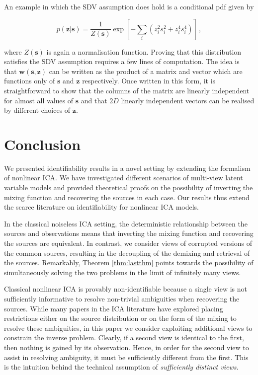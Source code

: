 An example in which the SDV assumption does hold is a conditional pdf given by

\begin{equation}
p(\bm{z}|\bm{s}) = \frac{1}{Z(\bm{s})} \exp \left[ - \sum_i (z_i^2  s_i^2 + z_i^4 s_i^4  ) \right]\,, \label{eq:satisfied}
\end{equation}

where $Z(\bm{s})$ is again a normalisation function.
Proving that this distribution satisfies the SDV assumption requires a few lines of computation.
The idea is that $\bm{w}(\bm{s}, \bm{z})$ can be written as the product of a matrix and vector which are functions only of $\bm{s}$ and $\bm{z}$ respectively.
Once written in this form, it is straightforward to show that the columns of the matrix are linearly independent for almost all values of $\bm{s}$ and that $2D$ linearly independent vectors can be realised by different choices of $\bm{z}$.


\section{Conclusion}
\label{sec:on_suffistv}
We presented identifiability results in a novel setting by extending the formalism of nonlinear ICA.
We have investigated different scenarios of multi-view latent variable models and provided theoretical proofs on the possibility of inverting the mixing function and recovering the sources in each case.
Our results thus extend the scarce literature on identifiability for nonlinear ICA models.

In the classical noiseless ICA setting, the deterministic relationship between the sources and observations means that inverting the mixing function and recovering the sources are equivalent.
In contrast, we consider views of corrupted versions of the common sources, resulting in the decoupling of the demixing and retrieval of the sources.
Remarkably, Theorem \ref{thm:lastthm} points towards the possibility of simultaneously solving the two problems in the limit of infinitely many views.

Classical nonlinear ICA is provably non-identifiable because a single view is not sufficiently informative to resolve non-trivial ambiguities when recovering the sources.
While many papers in the ICA literature have explored placing restrictions either on the source distribution or on the form of the mixing to resolve these ambiguities, in this paper we consider exploiting additional views to constrain the inverse problem.
Clearly, if a second view is identical to the first, then nothing is gained by its observation.
Hence, in order for the second view to assist in resolving ambiguity, it must be sufficiently different from the first.
This is the intuition behind the technical assumption of \emph{sufficiently distinct views}.


